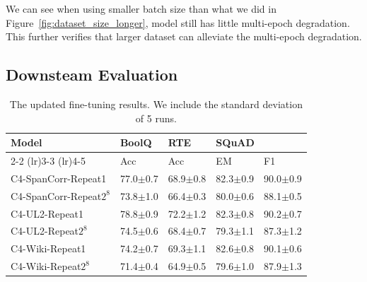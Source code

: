 \documentclass{article}
\begin{document}
We can see when using smaller batch size than what we did in Figure~\ref{fig:dataset_size_longer}, model still has little multi-epoch degradation. This further verifies that larger dataset can alleviate the multi-epoch degradation.

\subsection{Downsteam Evaluation}

\begin{table}[h]
\small
\vspace{-0.5cm}
\caption{The updated fine-tuning results. We include the standard deviation of 5 runs.}
\vspace{5pt}
\centering
\begin{tabular}{l ll ll }
\toprule 
Model      & BoolQ  &  RTE      & \multicolumn{2}{l}{SQuAD} \\  \cmidrule(lr){2-2} \cmidrule(lr){3-3} \cmidrule(lr){4-5} 
                & Acc & Acc & EM & F1  \\ \midrule
C4-SpanCorr-Repeat1    & 77.0$\pm$0.7   & 68.9$\pm$0.8     & 82.3$\pm$0.9   & 90.0$\pm$0.9      \\ 
C4-SpanCorr-Repeat$2^{8}$   & 73.8$\pm$1.0   & 66.4$\pm$0.3     & 80.0$\pm$0.6   & 88.1$\pm$0.5      \\ 
C4-UL2-Repeat1       & 78.8$\pm$0.9   & 72.2$\pm$1.2     & 82.3$\pm$0.8   & 90.2$\pm$0.7      \\ 
C4-UL2-Repeat$2^{8}$   & 74.5$\pm$0.6   & 68.4$\pm$0.7     & 79.3$\pm$1.1   & 87.3$\pm$1.2     \\ 
C4-Wiki-Repeat1       & 74.2$\pm$0.7   & 69.3$\pm$1.1     & 82.6$\pm$0.8   & 90.1$\pm$0.6      \\ 
C4-Wiki-Repeat$2^{8}$  & 71.4$\pm$0.4   & 64.9$\pm$0.5     & 79.6$\pm$1.0   & 87.9$\pm$1.3     \\  \bottomrule
\end{tabular}
\label{tbl:downstream}
\end{table}
\end{document}
